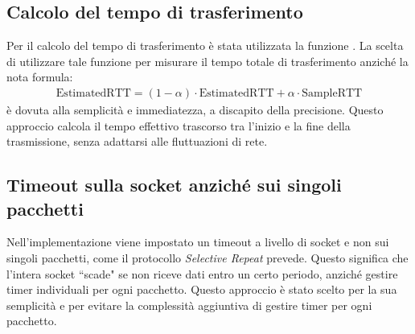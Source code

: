 \subsection{Calcolo del tempo di trasferimento }
Per il calcolo del tempo di trasferimento è stata utilizzata la funzione .
La scelta di utilizzare tale funzione per misurare il tempo totale di trasferimento anziché la nota formula:
\begin{eqnarray}
    \text{EstimatedRTT} = (1 - \alpha) \cdot \text{EstimatedRTT} + \alpha \cdot \text{SampleRTT} \nonumber
\end{eqnarray}
è dovuta alla semplicità e immediatezza, a discapito della precisione.
Questo approccio calcola il tempo effettivo trascorso tra l'inizio e la fine della trasmissione, senza adattarsi alle fluttuazioni di rete.

\subsection{Timeout sulla socket anziché sui singoli pacchetti }
Nell'implementazione viene impostato un timeout a livello di socket e non sui singoli pacchetti, come il protocollo \textit{Selective Repeat} prevede.
Questo significa che l'intera socket ``scade" se non riceve dati entro un certo periodo, anziché gestire timer individuali per ogni pacchetto.
Questo approccio è stato scelto per la sua semplicità e per evitare la complessità aggiuntiva di gestire timer per ogni pacchetto.
